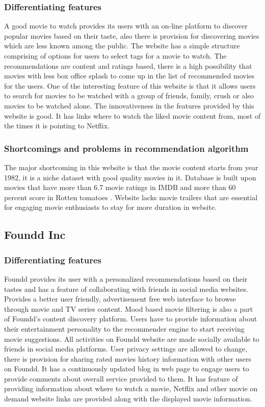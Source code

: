   \subsubsection{Differentiating features}
  \label{agoodmovietowatch_overview_DF}
    A good movie to watch provides its users with an on-line platform to discover popular movies based on their taste, also there is provision for discovering movies which are less known among the public. The website has a simple structure comprising of options for users to select tags for a movie to watch. The recommendations are content and ratings based, there is a high possibility that movies with less box office splash to come up in the list of recommended movies for the users. One of the interesting feature of this website is that it allows users to search for movies to be watched with a group of friends, family, crush or also movies to be watched alone. The innovativeness in the features provided by this website is good. It has links where to watch the liked movie content from, most of the times it is pointing to Netflix.
  \subsubsection{Shortcomings and problems in recommendation algorithm }
  \label{agoodmovietowatch_overview_SP}  
    The major shortcoming in this website is that the movie content starts from year 1982, it is a niche dataset with good quality movies in it.
    Database is built upon movies that have more than 6.7 movie ratings in \acrshort{IMDB} and more than 60 percent score in Rotten tomatoes \citep{Agoodmovietowatch_online}. Website lacks movie trailers that are essential for engaging movie enthusiasts to stay for more duration in  website.  

  \subsection{Foundd Inc}
  \label{Foundd_overview}   
  \subsubsection{Differentiating features}
  \label{Foundd_overview_DF}
    Foundd provides its user with a personalized recommendations based on their tastes and has a feature of collaborating with friends in social media websites. Provides a better user friendly, advertisement free web interface to browse through movie and TV series content. Mood based movie filtering is also a part of Foundd's content discovery platform. Users have to provide information about their entertainment personality to the recommender engine to start receiving movie suggestions. All activities on Foundd website are made socially available to friends in social media platforms. User privacy settings are allowed to change, there is provision for sharing rated movies history information with other users on Foundd. It has a continuously updated blog in web page to engage users to provide comments about overall service provided to them. It has feature of providing information about where to watch a movie, Netflix and other movie on demand website links are provided along with the displayed movie information.     
